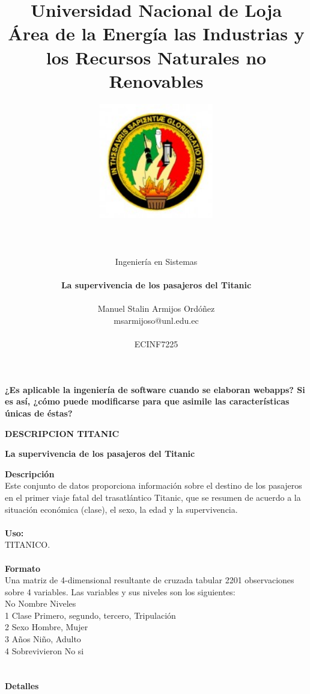 \documentclass[11pt]{report}
\title{\Huge Universidad Nacional de Loja \\ 
Área de la Energía las Industrias y los Recursos Naturales no Renovables}
\author{\includegraphics[width=5cm, height=5cm]{unl.jpg} \\\\\\\\
Ingeniería en Sistemas\\\\
\textbf{La supervivencia de los pasajeros del Titanic}\\\\
Manuel Stalin Armijos Ordóñez \\ msarmijoso@unl.edu.ec \\\\
 ECINF7225}\\\\
\begin{document}

\maketitle


\begin{center}\textbf{¿Es aplicable la ingeniería de software cuando se elaboran webapps? Si es así, ¿cómo puede
modificarse para que asimile las características únicas de éstas?}\end{center}



\begin{center}\textbf{DESCRIPCION TITANIC}\end{center}
\begin{center}\textbf{La supervivencia de los pasajeros del Titanic}\end{center}
\textbf{Descripción}\\
Este conjunto de datos proporciona información sobre el destino de los pasajeros en el primer viaje fatal del trasatlántico Titanic, que se resumen de acuerdo a la situación económica (clase), el sexo, la edad y la supervivencia.
\\\\
\textbf{Uso:}\\
TITANICO.
\\\\
\textbf{Formato}\\
Una matriz de 4-dimensional resultante de cruzada tabular 2201 observaciones sobre 4 variables. Las variables y sus niveles son los siguientes:\\

No	Nombre	Niveles\\
1	Clase	Primero, segundo, tercero, Tripulación\\
2	Sexo	Hombre, Mujer\\
3	Años	Niño, Adulto\\
4	Sobrevivieron	No si\\

\\\\
\textbf{Detalles}\\
\end{document}

